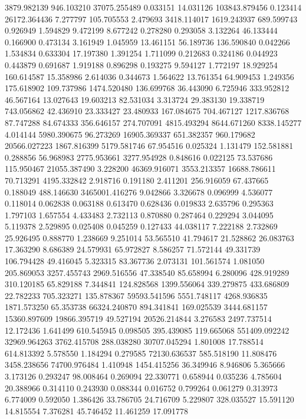 3879.982139
946.103210
37075.255489
0.033151
14.031126
103843.879456
0.123414
26172.364436
7.277797
105.705553
2.479693
3418.114017
1619.243937
689.599743
0.926949
1.594829
9.472199
8.677242
0.278280
0.293058
3.132264
46.133444
0.166900
0.473134
3.161949
1.045959
13.461151
56.189736
136.590840
0.042266
1.534834
0.633304
17.197380
1.391254
1.711099
0.212683
0.324186
0.044923
0.443879
0.691687
1.919188
0.896298
0.193275
9.594127
1.772197
18.929254
160.614587
15.358986
2.614036
0.344673
1.564622
13.761354
64.909453
1.249356
175.618902
109.737986
1474.520480
136.699768
36.443090
6.725946
333.952812
46.567164
13.027643
19.603213
82.531034
3.313724
29.383130
19.338719
743.056862
42.436910
23.333427
23.480933
167.084675
704.467127
1217.836768
87.747288
84.674333
356.646157
274.707091
4815.493294
8644.671260
8338.145277
4.014144
5980.390675
96.273269
16905.369337
651.382357
960.179682
20566.027223
1867.816399
5179.581746
67.954516
0.025324
1.131479
152.581881
0.288856
56.968983
2775.953661
3277.954928
0.848616
0.022125
73.537686
115.950467
21055.387490
3.228200
46369.916071
3553.213357
16688.786611
70.713291
4195.332842
2.918716
0.191180
2.411201
256.916059
67.437665
0.188049
488.146630
3465001.416276
9.042866
3.326678
0.096999
4.536077
0.118014
0.062838
0.063188
0.613470
0.628436
0.019833
2.635796
0.295363
1.797103
1.657554
4.433483
2.732113
0.870880
0.287464
0.229294
3.044095
5.119378
2.529895
0.025408
0.045259
0.127433
44.038117
7.222188
2.732869
25.926495
0.888770
1.238669
9.251014
53.565510
41.794617
21.528862
26.083763
17.363290
8.686389
24.579931
65.972827
8.586257
71.572144
49.331739
106.794428
49.416045
5.323315
83.367736
2.073131
101.561574
1.081050
205.869053
3257.455743
2969.516556
47.338540
85.658994
6.280096
428.919289
310.120185
65.829188
7.344841
124.828568
1399.556064
339.279875
433.686809
22.782233
705.323271
135.878367
59593.541596
5551.748117
4268.936835
1871.573250
65.353738
66324.240870
894.341841
169.025539
3444.681157
15360.897609
19866.395719
49.527194
20526.214844
3.276583
2497.737514
12.172436
1.641499
610.545945
0.098505
395.439085
119.665068
551409.092242
32969.964263
3762.415708
288.038280
30707.045294
1.801008
17.788514
614.813392
5.578550
1.184294
0.279585
72130.636537
585.518190
11.808476
3458.238656
74700.976484
1.410948
1454.415256
36.349946
8.946806
5.365666
3.173126
0.293247
98.008464
0.269094
22.330771
0.658944
0.035236
4.785604
20.388966
0.314110
0.243930
0.088344
0.016752
0.799264
0.061279
0.313973
6.774009
0.592050
1.386426
33.786705
24.716709
5.229807
328.035527
15.591120
14.815554
7.376281
45.746452
11.461259
17.091778
